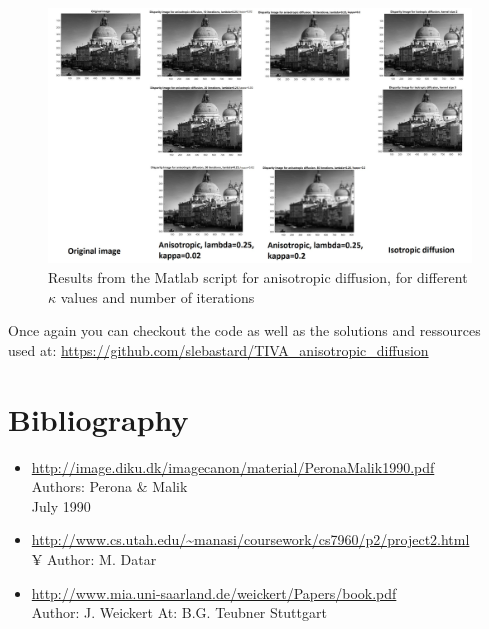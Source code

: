 \documentclass[12pt,a4paper]{article}
\begin{document}
\begin{figure}[h]
	\centering
	\includegraphics[scale=0.42]{anisotropic_diffusion.jpg}
	\caption{Results from the Matlab script for anisotropic diffusion, for different $\kappa$ values and number of iterations}	
\end{figure}

Once again you can checkout the code as well as the solutions and ressources used at: \url{https://github.com/slebastard/TIVA\_anisotropic\_diffusion}

\section{Bibliography}
\begin{itemize}
	\item \url{http://image.diku.dk/imagecanon/material/PeronaMalik1990.pdf}\\
	Authors: Perona \& Malik\\
	July 1990
	\item \url{http://www.cs.utah.edu/~manasi/coursework/cs7960/p2/project2.html}\\¥
	Author: M. Datar
	\item \url{http://www.mia.uni-saarland.de/weickert/Papers/book.pdf}\\
	Author: J. Weickert
	At: B.G. Teubner Stuttgart
\end{itemize}
\end{document}
